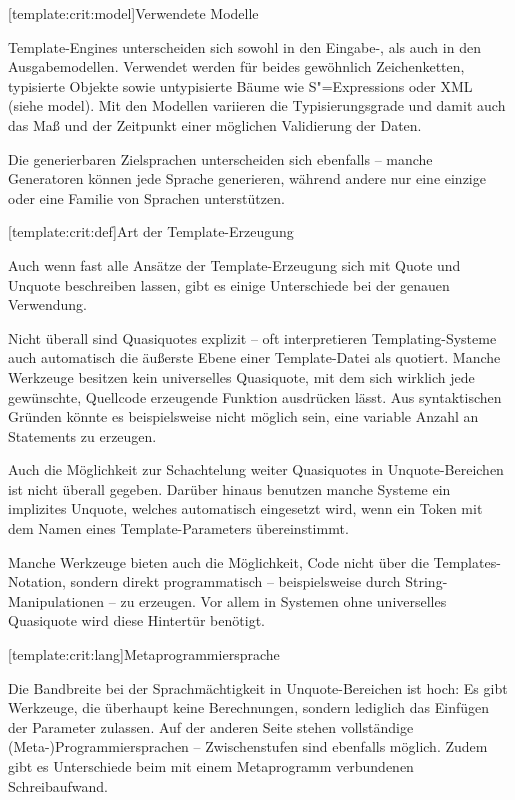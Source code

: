 \documentclass[12pt, a4paper, bibgerm]{scrbook}
\newcommand\lsubsection{}
\newcommand\cref{}
\newcommand{\seec}[1]{(siehe \cref{#1})}
\newcommand{\sexps}{S"=Expressions}
\begin{document}
\lsubsection[template:crit:model]{Verwendete Modelle}

Template-Engines unterscheiden sich sowohl in den Eingabe-, als auch in
den Ausgabemodellen. Verwendet werden für beides gewöhnlich
Zeichenketten, typisierte Objekte sowie untypisierte Bäume wie \sexps{}
oder XML \seec{model}. Mit den Modellen variieren die
Typisierungsgrade und damit auch das Maß und der Zeitpunkt einer
möglichen Validierung der Daten.

Die generierbaren Zielsprachen unterscheiden sich ebenfalls -- manche
Generatoren können jede Sprache generieren, während andere nur eine
einzige oder eine Familie von Sprachen unterstützen.

\lsubsection[template:crit:def]{Art der Template-Erzeugung}

Auch wenn fast alle Ansätze der Template-Erzeugung sich mit Quote und
Unquote beschreiben lassen, gibt es einige Unterschiede bei der genauen
Verwendung.

Nicht überall sind Quasiquotes explizit -- oft interpretieren
Templating-Systeme auch automatisch die äußerste Ebene einer Template-Datei als
quotiert. Manche Werkzeuge besitzen kein universelles
Quasiquote, mit dem sich wirklich jede gewünschte, Quellcode erzeugende
Funktion ausdrücken lässt. Aus syntaktischen Gründen könnte es
beispielsweise nicht möglich sein, eine variable Anzahl an Statements zu
erzeugen.

Auch die Möglichkeit zur Schachtelung weiter Quasiquotes in
Unquote-Bereichen ist nicht überall gegeben. Darüber hinaus benutzen
manche Systeme ein implizites Unquote, welches automatisch
eingesetzt wird, wenn ein Token mit dem Namen eines Template-Parameters
übereinstimmt.

Manche Werkzeuge bieten auch die Möglichkeit, Code nicht über die
Templates-Notation, sondern direkt programmatisch -- beispielsweise durch
String-Manipulationen -- zu erzeugen. Vor allem in Systemen ohne
universelles Quasiquote wird diese Hintertür benötigt.

\lsubsection[template:crit:lang]{Metaprogrammiersprache}

Die Bandbreite bei der Sprachmächtigkeit in Unquote-Bereichen ist hoch:
Es gibt Werkzeuge, die überhaupt keine Berechnungen, sondern lediglich das
Einfügen der Parameter zulassen. Auf der anderen Seite stehen
vollständige (Meta-)Programmiersprachen -- Zwischenstufen sind ebenfalls
möglich. Zudem gibt es Unterschiede beim mit einem Metaprogramm
verbundenen Schreibaufwand.
\end{document}
